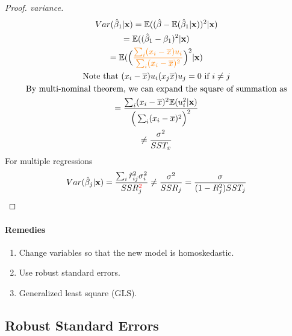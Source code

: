 \documentclass[]{article}
\begin{document}
		\begin{proof}[Proof. variance]
			\begin{gather}
				Var(\hat{\beta}_1 | \textbf{x}) = \mathbb{E}({(\hat{\beta} - \mathbb{E}({\hat{\beta}_1 | \textbf{x}}))^2 | \textbf{x}}) \\
				= \mathbb{E}({(\hat{\beta}_1 - \beta_1)^2 | \textbf{x}}) \\
				= \mathbb{E}({\Big(\textcolor{orange}{\frac{\sum_i (x_i - \overline{x})u_i}{\sum_i (x_i - \overline{x})^2}}\Big)^2|\textbf{x}}) \\
				\text{{Note that }} (x_i - \overline{x})u_i (x_j \overline{x})u_j = 0 \text{{ if }} i \neq j \\
				\text{{By multi-nominal theorem, we can expand the square of summation as}} \\
				= \frac{\sum_i(x_i - \overline{x})^2 \mathbb{E}({u_i^2 | \textbf{x}})}{\Big( \sum_i (x_i - \overline{x})^2 \Big)^2} \\
				\neq \frac{\sigma^2}{SST_x}
			\end{gather}
			For multiple regressions
			\begin{gather}
				Var(\hat{\beta}_j | \textbf{x}) = \frac{\sum_i{\tilde{r}_{ij}^2 \sigma_i^2}}{SSR_j^{\textcolor{red}{2}}} \neq \frac{\sigma^2}{SSR_j} = \frac{\sigma}{(1-R^2_j)SST_j}
			\end{gather}
		\end{proof}
		
		\paragraph{Remedies}
		\begin{enumerate}
			\item Change variables so that the new model is homoskedastic.
			\item Use robust standard errors.
			\item Generalized least square (GLS).
		\end{enumerate}
		
		\subsection{Robust Standard Errors}
\end{document}
